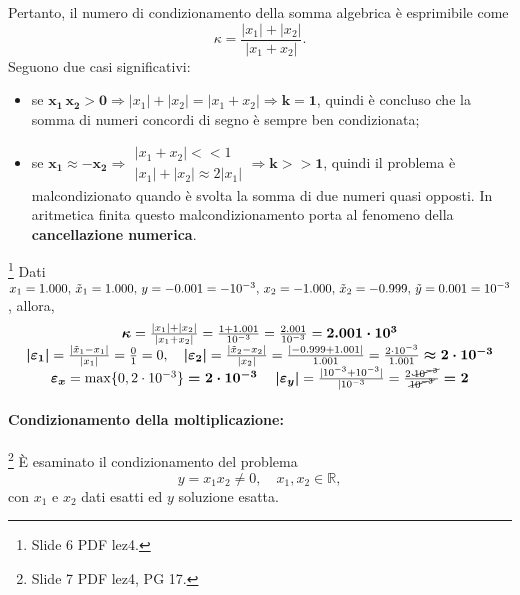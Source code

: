 Pertanto, il numero di condizionamento della somma algebrica è esprimibile come
\begin{equation*}
    \kappa=\frac{|x_1|+|x_2|}{|x_1+x_2|}.
\end{equation*}
Seguono due casi significativi:
\begin{itemize}
    \item se $\boldsymbol{x_1\, x_2>0}\Rightarrow|x_1|+|x_2|=|x_1+x_2|\Rightarrow \boldsymbol{k=1}$, quindi è concluso che la somma di numeri concordi di segno è sempre ben condizionata;
    \item se $\boldsymbol{x_1\approx -x_2}\Rightarrow\begin{matrix}
        |x_1+x_2| << 1\\
        |x_1|+|x_2| \approx 2|x_1|
    \end{matrix}\Rightarrow \boldsymbol{k>>1}$, quindi il problema è malcondizionato quando è svolta la somma di due numeri quasi opposti. In aritmetica finita questo malcondizionamento porta al fenomeno della \textbf{cancellazione numerica}.
\end{itemize}

\begin{example}
    \footnote{Slide 6 PDF lez4.} Dati $x_1=1.000,\, \Tilde{x}_1=1.000,\, y=-0.001=-10^{-3},\, x_2=-1.000,\,\Tilde{x}_2=-0.999,\, \Tilde{y}=0.001=10^{-3}$, allora,
    \begin{equation*}
        \begin{matrix}
            \boldsymbol\kappa=\frac{|x_1|+|x_2|}{|x_1+x_2|}=\frac{1+1.001}{10^{-3}}=\frac{2.001}{10^{-3}}=\boldsymbol{2.001\cdot 10^3}\\
            \boldsymbol{|\varepsilon_1|}=\frac{|\Tilde{x}_1-x_1|}{|x_1|}=\frac{0}{1}=0,\quad \boldsymbol{|\varepsilon_2|}=\frac{|\Tilde{x}_2-x_2|}{|x_2|}=\frac{|-0.999+1.001|}{1.001}=\frac{2\cdot 10^{-3}}{1.001}\boldsymbol{\approx 2\cdot 10^{-3}}\\
            \boldsymbol{\varepsilon_x}=\max\{0,2\cdot10^{-3}\}\boldsymbol{=2\cdot 10^{-3}}\quad\boldsymbol{|\varepsilon_y|}=\frac{|10^{-3}+10^{-3}|}{|10^{-3}}=\frac{2\cdot \cancel{10^{-3}}}{\cancel{10^{-3}}}\boldsymbol{=2}
        \end{matrix}
    \end{equation*}
\end{example}

\paragraph{Condizionamento della moltiplicazione:}\footnote{Slide 7 PDF lez4, PG 17.} È esaminato il condizionamento del problema
\begin{equation}\label{eq:probMol}
        y=x_1x_2\neq 0,\quad x_1,x_2\in\mathbb R,
\end{equation}
con $x_1$ e $x_2$ dati esatti ed $y$ soluzione esatta. 

